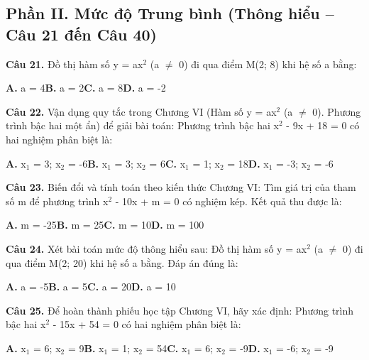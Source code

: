 \documentclass[11pt,a4paper]{article}
\begin{document}
\subsection*{\color{accent} Phần II. Mức độ Trung bình (Thông hiểu -- Câu 21 đến Câu 40)}
\textbf{\color{primary} Câu 21.} Đồ thị hàm số y = ax$^2$ (a $\ne$ 0) đi qua điểm M(2; 8) khi hệ số a bằng:\par
\hspace*{1.5em}\textbf{A.} a = 4\quad\quad \textbf{B.} a = 2\quad\quad \textbf{C.} a = 8\quad\quad \textbf{D.} a = -2\par\vspace{2pt}
\textbf{\color{primary} Câu 22.} Vận dụng quy tắc trong Chương VI (Hàm số y = ax$^2$ (a $\ne$ 0). Phương trình bậc hai một ẩn) để giải bài toán: Phương trình bậc hai x$^2$ - 9x + 18 = 0 có hai nghiệm phân biệt là:\par
\hspace*{1.5em}\textbf{A.} x$_1$ = 3; x$_2$ = -6\quad\quad \textbf{B.} x$_1$ = 3; x$_2$ = 6\quad\quad \textbf{C.} x$_1$ = 1; x$_2$ = 18\quad\quad \textbf{D.} x$_1$ = -3; x$_2$ = -6\par\vspace{2pt}
\textbf{\color{primary} Câu 23.} Biến đổi và tính toán theo kiến thức Chương VI: Tìm giá trị của tham số m để phương trình x$^2$ - 10x + m = 0 có nghiệm kép. Kết quả thu được là:\par
\hspace*{1.5em}\textbf{A.} m = -25\quad\quad \textbf{B.} m = 25\quad\quad \textbf{C.} m = 10\quad\quad \textbf{D.} m = 100\par\vspace{2pt}
\textbf{\color{primary} Câu 24.} Xét bài toán mức độ thông hiểu sau: Đồ thị hàm số y = ax$^2$ (a $\ne$ 0) đi qua điểm M(2; 20) khi hệ số a bằng. Đáp án đúng là:\par
\hspace*{1.5em}\textbf{A.} a = -5\quad\quad \textbf{B.} a = 5\quad\quad \textbf{C.} a = 20\quad\quad \textbf{D.} a = 10\par\vspace{2pt}
\textbf{\color{primary} Câu 25.} Để hoàn thành phiếu học tập Chương VI, hãy xác định: Phương trình bậc hai x$^2$ - 15x + 54 = 0 có hai nghiệm phân biệt là:\par
\hspace*{1.5em}\textbf{A.} x$_1$ = 6; x$_2$ = 9\quad\quad \textbf{B.} x$_1$ = 1; x$_2$ = 54\quad\quad \textbf{C.} x$_1$ = 6; x$_2$ = -9\quad\quad \textbf{D.} x$_1$ = -6; x$_2$ = -9\par\vspace{2pt}
\end{document}
